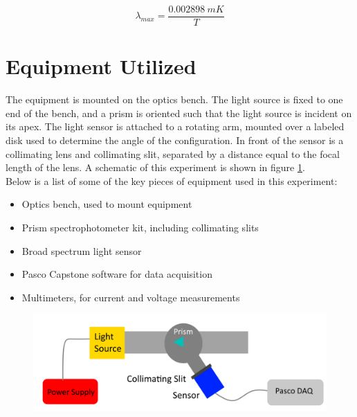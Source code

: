 \documentclass[a4paper]{article}
\begin{document}
\begin{equation}
\label{eq:wien}
\lambda_{max} = \frac{0.002898 \: mK}{T}
\end{equation}

\section{Equipment Utilized}

\qq The equipment is mounted on the optics bench. The light source is fixed to one end of the bench, and a prism is oriented such that the light source is incident on its apex. The light sensor is attached to a rotating arm, mounted over a labeled disk used to determine the angle of the configuration. In front of the sensor is a collimating lens and collimating slit, separated by a distance equal to the focal length of the lens. A schematic of this experiment is shown in figure \ref{blackbody_circuit}. \\

Below is a list of some of the key pieces of equipment used in this experiment:

\begin{itemize}
\item Optics bench, used to mount equipment
\item Prism spectrophotometer kit, including collimating slits
\item Broad spectrum light sensor
\item Pasco Capstone software for data acquisition
\item Multimeters, for current and voltage measurements
\end{itemize}

\begin{figure}[H]
\centering
\includegraphics[width=\textwidth]{blackbody_circuit.png}
\label{blackbody_circuit}
\end{figure}
\end{document}
